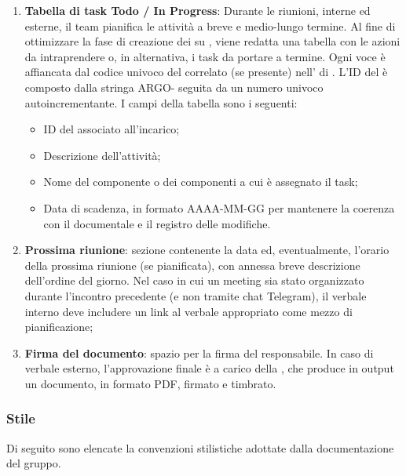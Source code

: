 \begin{enumerate}
\begin{itemize}
  \end{itemize}
  \item \textbf{Tabella di task Todo / In Progress}:
  Durante le riunioni, interne ed esterne, il team pianifica le attività a breve e medio-lungo termine. Al fine di ottimizzare la fase di creazione dei  su , viene redatta una tabella con le azioni da intraprendere o, in alternativa, i task da portare a termine. Ogni voce è affiancata dal codice univoco del  correlato (se presente) nell' di . L'ID del  è composto dalla stringa ARGO- seguita da un numero univoco autoincrementante. I campi della tabella sono i seguenti:
  \begin{itemize}
    \item ID del   associato all'incarico;
    \item Descrizione dell'attività;
    \item Nome del componente o dei componenti a cui è assegnato il task;
    \item Data di scadenza, in formato AAAA-MM-GG per mantenere la coerenza con il  documentale e il registro delle modifiche.
  \end{itemize}
  \item \textbf{Prossima riunione}: sezione contenente la data ed, eventualmente, l'orario della prossima riunione (se pianificata), con annessa breve descrizione dell'ordine del giorno. Nel caso in cui un meeting sia stato organizzato durante l'incontro precedente (e non tramite chat Telegram), il verbale interno deve includere un link al verbale appropriato come mezzo di pianificazione;
  \item \textbf{Firma del documento}: spazio per la firma del responsabile. In caso di verbale esterno, l'approvazione finale è a carico della , che produce in output un documento, in formato PDF, firmato e timbrato.
\end{enumerate}

\subsubsection{Stile}
Di seguito sono elencate la convenzioni stilistiche adottate dalla documentazione del gruppo.

